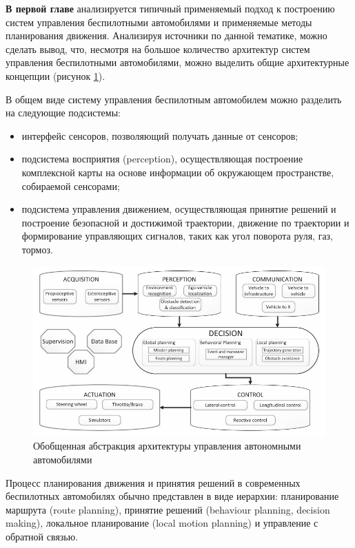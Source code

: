 \textbf{В первой главе} анализируется типичный применяемый подход к построению систем управления
беспилотными автомобилями и применяемые методы планирования движения. Анализируя источники по данной тематике,
можно сделать вывод, что, несмотря на большое количество архитектур систем управления беспилотными
автомобилями, можно выделить общие архитектурные концепции (рисунок \ref{img:general_arch}).

В общем виде систему управления беспилотным автомобилем
можно разделить на следующие подсистемы:
\begin{itemize}
    \item интерфейс сенсоров, позволяющий получать данные от сенсоров;
    \item подсистема восприятия (perception), осуществляющая построение комплексной карты на основе
          информации об окружающем пространстве, собираемой сенсорами;
    \item подсистема управления движением, осуществляющая принятие решений и построение безопасной
          и достижимой траектории, движение по траектории и формирование управляющих
          сигналов, таких как угол поворота руля, газ, тормоз.
\end{itemize}

\begin{figure}[h]
    \centering
    \includegraphics[width=\linewidth]{images/general_arch}
    \caption{Обобщенная абстракция архитектуры управления автономными автомобилями}
    \label{img:general_arch}
\end{figure}

Процесс планирования движения и принятия решений в современных беспилотных автомобилях обычно представлен в виде
иерархии: планирование маршрута (route planning), принятие решений (behaviour planning, decision making),
локальное планирование (local motion planning) и управление с обратной связью.

